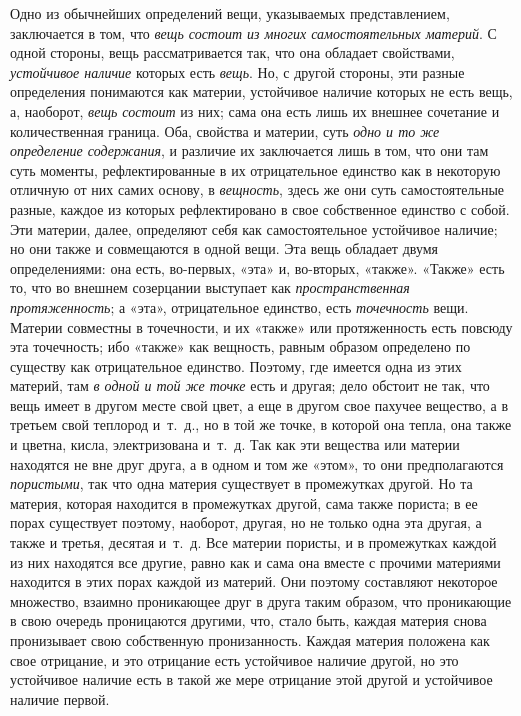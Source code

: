 Одно из обычнейших определений вещи, указываемых представлением, заключается
в том, что {\em вещь состоит из многих самостоятельных
материй}. С одной стороны, вещь рассматривается так, что она обладает
свойствами, {\em устойчивое наличие} которых есть
{\em вещь}. Но, с другой стороны, эти разные
определения понимаются как материи, устойчивое наличие которых не есть
вещь, а, наоборот, {\em вещь состоит} из них; сама она
есть лишь их внешнее сочетание и количественная граница. Оба, свойства и
материи, суть {\em одно и то же определение
содержания}, и различие их заключается лишь в том, что они там суть
моменты, рефлектированные в их отрицательное единство как в некоторую
отличную от них самих основу, в {\em вещность}, здесь
же они суть самостоятельные разные, каждое из которых рефлектировано в свое
собственное единство с собой. Эти материи, далее, определяют себя как
самостоятельное устойчивое наличие; но они также и совмещаются в одной
вещи. Эта вещь обладает двумя определениями: она есть, во-первых, «эта» и,
во-вторых, «также». «Также» есть то, что во внешнем созерцании выступает
как {\em пространственная протяженность}; а «эта»,
отрицательное единство, есть {\em точечность} вещи.
Материи совместны в точечности, и их «также» или протяженность есть повсюду
эта точечность; ибо «также» как вещность, равным образом определено по
существу как отрицательное единство. Поэтому, где имеется одна из этих
материй, там {\em в одной и той же точке} есть и
другая; дело обстоит не так, что вещь имеет в другом месте свой цвет, а еще
в другом свое пахучее вещество, а в третьем свой теплород и~т.~д., но в той
же точке, в которой она тепла, она также и цветна, кисла, электризована
и~т.~д. Так как эти вещества или материи находятся не вне друг друга, а в
одном и том же «этом», то они предполагаются
{\em пористыми}, так что одна материя существует в
промежутках другой. Но та материя, которая находится в промежутках другой,
сама также пориста; в ее порах существует поэтому, наоборот, другая, но не
только одна эта другая, а также и третья, десятая и~т.~д. Все материи
пористы, и в промежутках каждой из них находятся все другие, равно как и
сама она вместе с прочими материями находится в этих порах каждой из
материй. Они поэтому составляют некоторое множество, взаимно проникающее
друг в друга таким образом, что проникающие в свою очередь проницаются
другими, что, стало быть, каждая материя снова пронизывает свою собственную
пронизанность. Каждая материя положена как свое отрицание, и это отрицание
есть устойчивое наличие другой, но это устойчивое наличие есть в такой же
мере отрицание этой другой и устойчивое наличие первой.

